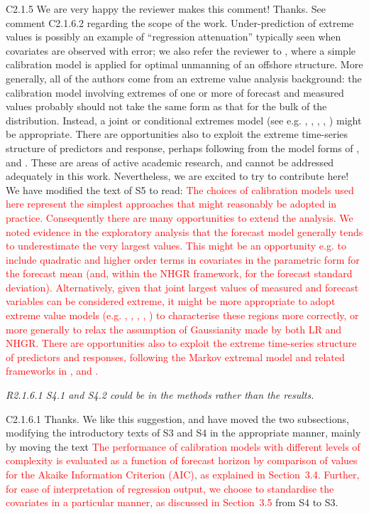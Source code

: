 \documentclass[a4paper,10pt]{article}
\newcommand{\ed}[1]{\textcolor{red}{#1}}
\begin{document}
	C2.1.5 We are very happy the reviewer makes this comment! Thanks. See comment C2.1.6.2 regarding the scope of the work. Under-prediction of extreme values is possibly an example of ``regression attenuation'' typically seen when covariates are observed with error; we also refer the reviewer to \cite{TowEA21}, where a simple calibration model is applied for optimal unmanning of an offshore structure. More generally, all of the authors come from an extreme value analysis background: the calibration model involving extremes of one or more of forecast and measured values probably should not take the same form as that for the bulk of the distribution. Instead, a joint or conditional extremes model (see e.g. \citealt{HffTwn04}, \citealt{JntEwnRnd13}, \citealt{TowEA22}, \citealt{TowEA24}, \citealt{MrpEA24a}) might be appropriate. There are opportunities also to exploit the extreme time-series structure of predictors and response, perhaps following from the model forms of \cite{WntTwn16}, \cite{TndEA18} and \cite{TndEA23}. These are areas of active academic research, and cannot be addressed adequately in this work. Nevertheless, we are excited to try to contribute here! We have modified the text of S5 to read: \ed{The choices of calibration models used here represent the simplest approaches that might reasonably be adopted in practice. Consequently there are many opportunities to extend the analysis. We noted evidence in the exploratory analysis that the forecast model generally tends to underestimate the very largest values. This might be an opportunity e.g. to include quadratic and higher order terms in covariates in the parametric form for the forecast mean (and, within the NHGR framework, for the forecast standard deviation). Alternatively, given that joint largest values of measured and forecast variables can be considered extreme, it might be more appropriate to adopt extreme value models (e.g. \citealt{DvsSmt90}, \citealt{HffTwn04}, \citealt{JntEA14}, \citealt{TowEA23}, \citealt{TowEA24}) to characterise these regions more correctly, or more generally to relax the assumption of Gaussianity made by both LR and NHGR. There are opportunities also to exploit the extreme time-series structure of predictors and responses, following the Markov extremal model and related frameworks in \cite{WntTwn16}, \cite{TndEA18} and \cite{TndEA23}.}
	
	\emph{R2.1.6.1 S4.1 and S4.2 could be in the methods rather than the results.}
	
	C2.1.6.1 Thanks. We like this suggestion, and have moved the two subsections, modifying the introductory texts of S3 and S4 in the appropriate manner, mainly by moving the text \ed{The performance of calibration models with different levels of complexity is evaluated as a function of forecast horizon by comparison of values for the Akaike Information Criterion (AIC), as explained in Section~3.4. Further, for ease of interpretation of regression output, we choose to standardise the covariates in a particular manner, as discussed in Section~3.5} from S4 to S3.
	
\end{document}
